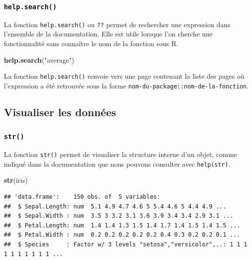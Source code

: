 \documentclass[]{book}
\newenvironment{Shaded}{\begin{snugshade}}{\end{snugshade}}
\newcommand{\KeywordTok}[1]{\textcolor[rgb]{0.13,0.29,0.53}{\textbf{#1}}}
\newcommand{\NormalTok}[1]{#1}
\newcommand{\StringTok}[1]{\textcolor[rgb]{0.31,0.60,0.02}{#1}}
\begin{document}
\hypertarget{l015helpsearch}{%
\subsubsection{\texorpdfstring{\texttt{help.search()}}{help.search()}}\label{l015helpsearch}}

La fonction \texttt{help.search()} ou \texttt{??} permet de rechercher une expression dans l'ensemble de la documentation. Elle est utile lorsque l'on cherche une fonctionnalité sans connaître le nom de la fonction sous R.

\begin{Shaded}
\begin{Highlighting}[]
\KeywordTok{help.search}\NormalTok{(}\StringTok{"average"}\NormalTok{)}
\end{Highlighting}
\end{Shaded}

La fonction \texttt{help.search()} renvoie vers une page contenant la liste des pages où l'expression a été retrouvée sous la forme \texttt{nom-du-package::nom-de-la-fonction}.

\hypertarget{visualiser-les-donnees}{%
\subsection{Visualiser les données}\label{visualiser-les-donnees}}

\hypertarget{l015str}{%
\subsubsection{\texorpdfstring{\texttt{str()}}{str()}}\label{l015str}}

La fonction \texttt{str()} permet de visualiser la structure interne d'un objet, comme indiqué dans la documentation que nous pouvons consulter avec \texttt{help(str)}.

\begin{Shaded}
\begin{Highlighting}[]
\KeywordTok{str}\NormalTok{(iris)}
\end{Highlighting}
\end{Shaded}

\begin{verbatim}
## 'data.frame':    150 obs. of  5 variables:
##  $ Sepal.Length: num  5.1 4.9 4.7 4.6 5 5.4 4.6 5 4.4 4.9 ...
##  $ Sepal.Width : num  3.5 3 3.2 3.1 3.6 3.9 3.4 3.4 2.9 3.1 ...
##  $ Petal.Length: num  1.4 1.4 1.3 1.5 1.4 1.7 1.4 1.5 1.4 1.5 ...
##  $ Petal.Width : num  0.2 0.2 0.2 0.2 0.2 0.4 0.3 0.2 0.2 0.1 ...
##  $ Species     : Factor w/ 3 levels "setosa","versicolor",..: 1 1 1 1 1 1 1 1 1 1 ...
\end{verbatim}
\end{document}
